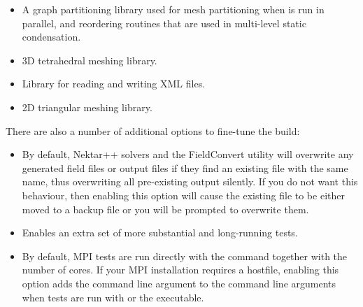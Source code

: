 \begin{itemize}
    \item {}

    A graph partitioning library used for mesh partitioning when \nekpp is run
    in parallel, and reordering routines that are used in multi-level static
    condensation.

    \item {}
    
    3D tetrahedral meshing library.
    
    \item {}

    Library for reading and writing XML files.
    
    \item {}
    
    2D triangular meshing library.
\end{itemize}

There are also a number of additional options to fine-tune the build:
\begin{itemize}
    \item {}

    By default, Nektar++ solvers and the FieldConvert utility will overwrite
    any generated field files or output files if they find an existing file with
    the same name, thus overwriting all pre-existing output silently. If you do
    not want this behaviour, then enabling this option will cause the existing
    file to be either moved to a backup file or you will be prompted to
    overwrite them.

    \item {}
    
    Enables an extra set of more substantial and long-running tests.
    
    \item {}
    
    By default, MPI tests are run directly with the  command
    together with the number of cores. If your MPI installation requires a
    hostfile, enabling this option adds the command line argument
     to the command line arguments when tests are run
    with  or the  executable.
\end{itemize}
